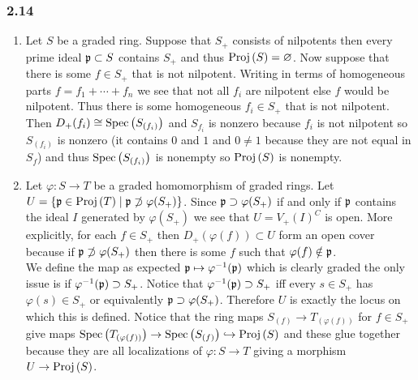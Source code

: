 \documentclass[12pt]{article}
\begin{document}
\subsubsection{2.14}

\begin{enumerate}
\item Let $S$ be a graded ring. Suppose that $S_+$ consists of nilpotents then every prime ideal $\mathfrak{p} \subset S$ contains $S_+$ and thus $\mathrm{Proj}\left( S \right) = \varnothing$. Now suppose that there is some $f \in S_+$ that is not nilpotent. Writing in terms of homogeneous parts $f = f_1 + \cdots + f_n$ we see that not all $f_i$ are nilpotent else $f$ would be nilpotent. Thus there is some homogeneous $f_i \in S_+$ that is not nilpotent. Then $D_+(f_i) \cong \mathrm{Spec}\left( S_{(f_i)} \right)$ and $S_{f_i}$ is nonzero because $f_i$ is not nilpotent so $S_{(f_i)}$ is nonzero (it contains $0$ and $1$ and $0 \neq 1$ because they are not equal in $S_f$) and thus $\mathrm{Spec}\left( S_{(f_i)} \right)$ is nonempty so $\mathrm{Proj}\left( S \right)$ is nonempty.

\item Let $\varphi : S \to T$ be a graded homomorphism of graded rings. Let $U = \{ \mathfrak{p} \in \mathrm{Proj}\left( T \right) \mid \mathfrak{p} \not\supset \varphi(S_+) \}$. Since $\mathfrak{p} \supset \varphi(S_+)$ if and only if $\mathfrak{p}$ contains the ideal $I$ generated by $\varphi(S_+)$ we see that $U = V_+(I)^C$ is open. More explicitly, for each $f \in S_+$ then $D_+(\varphi(f)) \subset U$ form an open cover because if $\mathfrak{p} \not\supset \varphi(S_+)$ then there is some $f$ such that $\varphi(f) \notin \mathfrak{p}$. 
\bigskip\\
We define the map as expected $\mathfrak{p} \mapsto \varphi^{-1}(\mathfrak{p})$ which is clearly graded the only issue is if $\varphi^{-1}(\mathfrak{p}) \supset S_+$. Notice that $\varphi^{-1}(\mathfrak{p}) \supset S_+$ iff every $s \in S_+$ has $\varphi(s) \in S_+$ or equivalently $\mathfrak{p} \supset \varphi(S_+)$. Therefore $U$ is exactly the locus on which this is defined. Notice that the ring maps $S_{(f)} \to T_{(\varphi(f))}$ for $f \in S_+$ give maps $\mathrm{Spec}\left( T_{(\varphi(f))} \right) \to \mathrm{Spec}\left( S_{(f)} \right) \hookrightarrow \mathrm{Proj}\left( S \right)$ and these glue together because they are all localizations of $\varphi : S \to T$ giving a morphism $U \to \mathrm{Proj}\left( S \right)$.


\end{enumerate}
\end{document}
